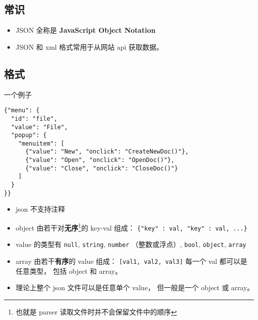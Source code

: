 
\begin{issues}
\issueDraft
\end{issues}

\subsection{常识}
\begin{itemize}
\item JSON 全称是 \textbf{JavaScript Object Notation}
\item JSON 和 xml 格式常用于从网站 api 获取数据。
\end{itemize}

\subsection{格式}
一个例子
\begin{lstlisting}[language=none]
{"menu": {
  "id": "file",
  "value": "File",
  "popup": {
    "menuitem": [
      {"value": "New", "onclick": "CreateNewDoc()"},
      {"value": "Open", "onclick": "OpenDoc()"},
      {"value": "Close", "onclick": "CloseDoc()"}
    ]
  }
}}
\end{lstlisting}

\begin{itemize}
\item json 不支持注释
\item object 由若干对\textbf{无序}\footnote{也就是 parser 读取文件时并不会保留文件中的顺序}的 key-val 组成： \verb`{"key" : val, "key" : val, ...}`
\item value 的类型有 \verb`null`, \verb`string`, \verb`number` （整数或浮点）, \verb`bool`, \verb`object`, \verb`array`
\item array 由若干\textbf{有序}的 value 组成： \verb`[val1, val2, val3]` 每一个 val 都可以是任意类型， 包括 object 和 array。
\item 理论上整个 json 文件可以是任意单个 value， 但一般是一个 object 或 array。
\end{itemize}
